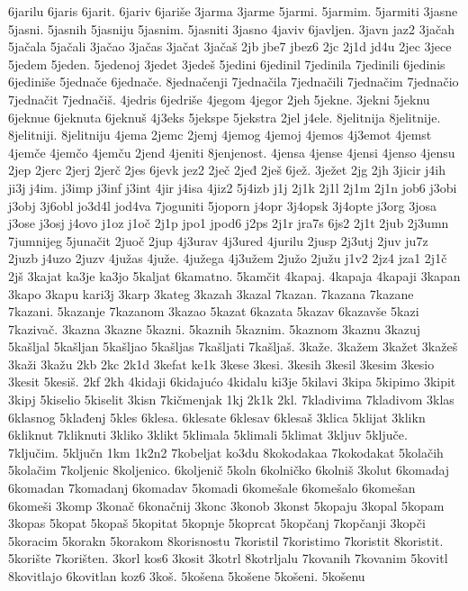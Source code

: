 {6jarilu
6jaris
6jarit.
6jariv
6jariše
3jarma
3jarme
5jarmi.
5jarmim.
5jarmiti
3jasne
5jasni.
5jasnih
5jasniju
5jasnim.
5jasniti
3jasno
4javiv
6javljen.
3javn
jaz2
3jačah
5jačala
5jačali
3jačao
3jačas
3jačat
3jačaš
2jb
jbe7
jbez6
2jc
2j1d
jd4u
2jec
3jece
5jedem
5jeden.
5jedenoj
3jedet
3jedeš
5jedini
6jedinil
7jedinila
7jedinili
6jedinis
6jediniše
5jednače
6jednače.
8jednačenji
7jednačila
7jednačili
7jednačim
7jednačio
7jednačit
7jednačiš.
4jedris
6jedriše
4jegom
4jegor
2jeh
5jekne.
3jekni
5jeknu
6jeknue
6jeknuta
6jeknuš
4j3eks
5jekspe
5jekstra
2jel
j4ele.
8jelitnija
8jelitnije.
8jelitniji.
8jelitniju
4jema
2jemc
2jemj
4jemog
4jemoj
4jemos
4j3emot
4jemst
4jemče
4jemčo
4jemču
2jend
4jeniti
8jenjenost.
4jensa
4jense
4jensi
4jenso
4jensu
2jep
2jerc
2jerj
2jerč
2jes
6jevk
jez2
2ječ
2jeđ
2ješ
6jež.
3ježet
2jg
2jh
3jicir
j4ih
ji3j
j4im.
j3imp
j3inf
j3int
4jir
j4isa
4jiz2
5j4izb
j1j
2j1k
2j1l
2j1m
2j1n
job6
j3obi
j3obj
3j6obl
jo3d4l
jod4va
7joguniti
5joporn
j4opr
3j4opsk
3j4opte
j3org
3josa
j3ose
j3osj
j4ovo
j1oz
j1oč
2j1p
jpo1
jpod6
j2ps
2j1r
jra7s
6js2
2j1t
2jub
2j3umn
7jumnijeg
5junačit
2juoč
2jup
4j3urav
4j3ured
4jurilu
2jusp
2j3utj
2juv
ju7z
2juzb
j4uzo
2juzv
4južas
4juže.
4južega
4j3užem
2južo
2južu
j1v2
2jz4
jza1
2j1č
2jš
3kajat
ka3je
ka3jo
5kaljat
6kamatno.
5kamčit
4kapaj.
4kapaja
4kapaji
3kapan
3kapo
3kapu
kari3j
3karp
3kateg
3kazah
3kazal
7kazan.
7kazana
7kazane
7kazani.
5kazanje
7kazanom
3kazao
5kazat
6kazata
5kazav
6kazavše
5kazi
7kazivač.
3kazna
3kazne
5kazni.
5kaznih
5kaznim.
5kaznom
3kaznu
3kazuj
5kašljal
5kašljan
5kašljao
5kašljas
7kašljati
7kašljaš.
3kaže.
3kažem
3kažet
3kažeš
3kaži
3kažu
2kb
2kc
2k1d
3kefat
ke1k
3kese
3kesi.
3kesih
3kesil
3kesim
3kesio
3kesit
5kesiš.
2kf
2kh
4kidaji
6kidajućo
4kidalu
ki3je
5kilavi
3kipa
5kipimo
3kipit
3kipj
5kiselio
5kiselit
3kisn
7kičmenjak
1kj
2k1k
2kl.
7kladivima
7kladivom
3klas
6klasnog
5klađenj
5kles
6klesa.
6klesate
6klesav
6klesaš
3klica
5klijat
3klikn
6kliknut
7kliknuti
3kliko
3klikt
5klimala
5klimali
5klimat
3kljuv
5ključe.
7ključim.
5ključn
1km
1k2n2
7kobeljat
ko3du
8kokodakaa
7kokodakat
5kolačih
5kolačim
7koljenic
8koljenico.
6koljenič
5koln
6kolničko
6kolniš
3kolut
6komadaj
6komadan
7komadanj
6komadav
5komadi
6komešale
6komešalo
6komešan
6komeši
3komp
3konač
6konačnij
3konc
3konob
3konst
5kopaju
3kopal
5kopam
3kopas
5kopat
5kopaš
5kopitat
5kopnje
5koprcat
5kopčanj
7kopčanji
3kopči
5koracim
5korakn
5korakom
8korisnostu
7koristil
7koristimo
7koristit
8koristit.
5korište
7korišten.
3korl
kos6
3kosit
3kotrl
8kotrljalu
7kovanih
7kovanim
5kovitl
8kovitlajo
6kovitlan
koz6
3koš.
5košena
5košene
5košeni.
5košenu
}
